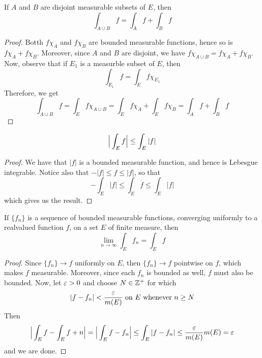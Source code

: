 \begin{corollary}
    If $A$ and  $B$ are disjoint measurable subsets of $E$, then
    \begin{equation*}
        \int_{A \cup B}{f}=\int_A{f}+\int_{B}{f}
    \end{equation*}
\end{corollary}
\begin{proof}
    Botth $f\chi_A$ and  $f\chi_B$ are bounded measurable functions, hence so is
     $f\chi_A+f\chi_B$. Moreover, since  $A$ and  $B$ are disjoint, we have
     $f\chi_{A \cup B}=f\chi_A+f\chi_B$. Now, observe that if $E_1$ is a
     measurble subset of $E$, then
     \begin{equation*}
         \int_{E_1}{f}=\int_E{f\chi_{E_1}}
     \end{equation*}
     Therefore, we get
     \begin{equation*}
         \int_{A \cup B}{f}=\int_E{f\chi_{A \cup B}}=
         \int_E{f\chi_A}+\int_E{f\chi_B}=\int_A{f}+\int_B{f}
     \end{equation*}
\end{proof}
\begin{corollary}
    \begin{equation*}
        \Big{|} \int_E{f} \Big{|} \leq \int_E{|f|}
    \end{equation*}
\end{corollary}
\begin{proof}
    We have that $|f|$ is a bounded measurable function, and hence is Lebesgue
    integrable. Notice also that  $-|f| \leq f \leq |f|$, so that
    \begin{equation*}
        -\int_E{|f|} \leq \int_E{f} \leq \int_E{|f|}
    \end{equation*}
    which gives us the result.
\end{proof}

\begin{lemma}\label{10.1.6}
    If $\{f_n\}$ is a sequence of bounded measurable functions, converging
    uniformly to a realvalued function $f$, on a set $E$ of finite measure, then
    \begin{equation*}
        \lim_{n \xrightarrow{} \infty}{\int_E{f_n}}=\int_E{f}
    \end{equation*}
\end{lemma}
\begin{proof}
    Since $\{f_n\} \xrightarrow{} f$ uniformly on $E$, then $\{f_n\}
    \xrightarrow{} f$ pointwise on $f$, which makes  $f$ measurable. Moreover,
    since each  $f_n$ is bounded as well,  $f$ must also be bounded. Now, let
    $\varepsilon>0$ and choose  $N \in \mathbb{Z}^+$ for which
    \begin{equation*}
        |f-f_n|<\frac{\varepsilon}{m(E)} \text{ on }  E \text{ whenever } n \geq N
    \end{equation*}
    Then
    \begin{equation*}
        \Big{|} \int_E{f}-\int_E{f+n} \Big{|}=
        \Big{|} \int_E{f-f_n} \Big{|} \leq \int_E{|f-f_n|} \leq
        \frac{\varepsilon}{m(E)}m(E)=\varepsilon
    \end{equation*}
    and we are done.
\end{proof}

